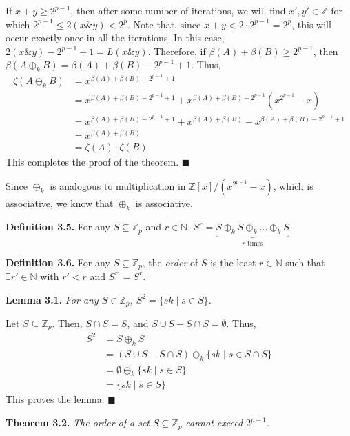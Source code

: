 \documentclass{article}
\newcommand{\zee}{\mathbb{Z}}
\newcommand{\N}{\mathbb{N}}
\begin{document}
If $x + y \geq 2^{p-1}$, then after some number of iterations,
we will find $x', y' \in \zee$ for which
$2^{p-1} \leq 2(x \mathbin{\&} y) < 2^p$.
Note that, since $x + y < 2 \cdot 2^{p-1} = 2^p$, this will occur exactly
once in all the iterations. In this case,
$2(x \mathbin{\&} y) - 2^{p-1} + 1 = L(x \mathbin{\&} y)$.
Therefore, if $\beta(A) + \beta(B) \geq 2^{p-1}$, then
$\beta(A \oplus_k B) = \beta(A) + \beta(B) - 2^{p-1} + 1$.
Thus,
\[\begin{split}
    \zeta(A \oplus_k B) &= x^{\beta(A) + \beta(B) - 2^{p-1} + 1} \\
    &= x^{\beta(A) + \beta(B) - 2^{p-1} + 1} +
        x^{\beta(A) + \beta(B) - 2^{p-1}}(x^{2^{p-1}} - x) \\
    &= x^{\beta(A) + \beta(B) - 2^{p-1} + 1} +
        x^{\beta(A) + \beta(B)} - x^{\beta(A) + \beta(B) - 2^{p-1} + 1} \\
    &= x^{\beta(A) + \beta(B)} \\
    &= \zeta(A) \cdot \zeta(B)
\end{split}\]
This completes the proof of the theorem. $\blacksquare$

Since $\oplus_k$ is analogous to multiplication in
$\zee[x]/(x^{2^{p-1}} - x)$, which is associative,
we know that $\oplus_k$ is associative.

\textbf{Definition 3.5.} For any $S \subseteq \zee_p$ and $r \in \N$,
$S^r = \underbrace{S \oplus_k S \oplus_k \ldots \oplus_k S}
_{r\text{ times}}$

\textbf{Definition 3.6.} For any $S \subseteq \zee_p$, the \textit{order}
of $S$ is the least $r \in \N$ such that $\exists r' \in \N$ with
$r' < r$ and $S^{r'} = S^r$.

\textbf{Lemma 3.1.} \textit{For any $S \in \zee_p$,
$S^2 = \{sk \mid s \in S\}$.}

Let $S \subseteq \zee_p$.
Then, $S \cap S = S$, and $S \cup S - S \cap S = \emptyset$.
Thus,
\[\begin{split}
S^2 &= S \oplus_k S \\
&= (S \cup S - S \cap S) \oplus_k \{sk \mid s \in S \cap S\} \\
&= \emptyset \oplus_k \{sk \mid s \in S\} \\
&= \{sk \mid s \in S\}
\end{split}\]
This proves the lemma. $\blacksquare$

\textbf{Theorem 3.2.} \textit{The order of a set
$S \subseteq \zee_p$ cannot exceed $2^{p-1}$.}
\end{document}
